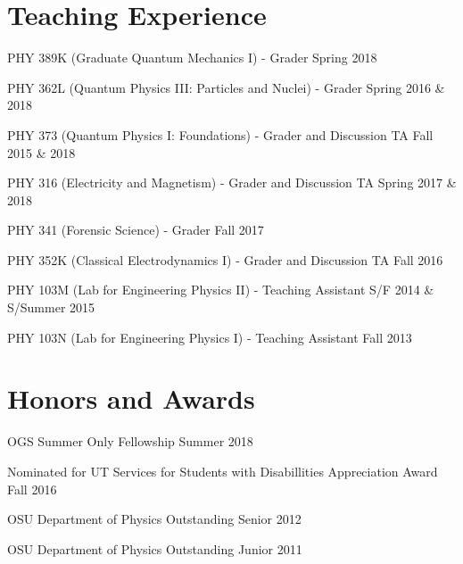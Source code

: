 \documentclass[letterpaper]{article}
\renewenvironment{itemize}{
  \begin{list}{}{
    \setlength{\leftmargin}{1.5em}
  }
}{
  \end{list}
}
\begin{document}
\section*{Teaching Experience}
\begin{itemize}

\item PHY 389K (Graduate Quantum Mechanics I) - Grader \hfill{Spring 2018}

\item PHY 362L (Quantum Physics III: Particles and Nuclei) - Grader \hfill{Spring 2016 \& 2018}

\item PHY 373 (Quantum Physics I: Foundations) - Grader and Discussion TA \hfill{Fall 2015 \& 2018}

\item PHY 316 (Electricity and Magnetism) - Grader and Discussion TA \hfill Spring 2017 \& 2018

\item PHY 341 (Forensic Science) - Grader \hfill Fall 2017

\item PHY 352K (Classical Electrodynamics I) - Grader and Discussion TA \hfill Fall 2016

\item PHY 103M (Lab for Engineering Physics II) - Teaching Assistant \hfill {S/F 2014 \& S/Summer 2015}

\item PHY 103N (Lab for Engineering Physics I) - Teaching Assistant \hfill {Fall 2013}

\end{itemize}

\section*{Honors and Awards}
\begin{itemize} \itemsep1pt \parskip0pt 

\item OGS Summer Only Fellowship \hfill{Summer 2018}

\item Nominated for UT Services for Students with Disabillities Appreciation Award \hfill{Fall 2016}

\item OSU Department of Physics Outstanding Senior \hfill{2012}

\item OSU Department of Physics Outstanding Junior \hfill{2011}
\end{itemize}
\end{document}
